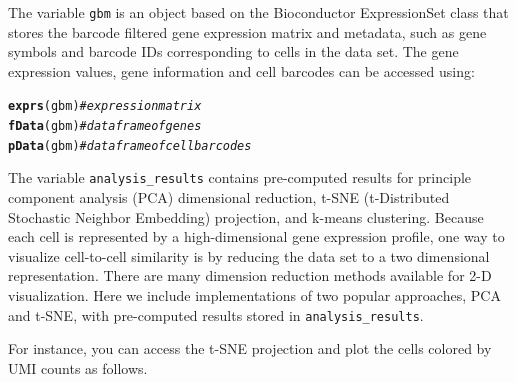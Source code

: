 \documentclass[10pt,oneside]{article}\usepackage[]{graphicx}\usepackage[]{color}
\makeatletter
\newcommand{\hlcom}[1]{\textcolor[rgb]{0.678,0.584,0.686}{\textit{#1}}}%
\newcommand{\hlstd}[1]{\textcolor[rgb]{0.345,0.345,0.345}{#1}}%
\newcommand{\hlkwd}[1]{\textcolor[rgb]{0.737,0.353,0.396}{\textbf{#1}}}%
\newenvironment{kframe}{%
 \def\at@end@of@kframe{}%
 \ifinner\ifhmode%
  \def\at@end@of@kframe{\end{minipage}}%
  \begin{minipage}{\columnwidth}%
 \fi\fi%
 \def\FrameCommand##1{\hskip\@totalleftmargin \hskip-\fboxsep
 \colorbox{shadecolor}{##1}\hskip-\fboxsep
     \hskip-\linewidth \hskip-\@totalleftmargin \hskip\columnwidth}%
 \MakeFramed {\advance\hsize-\width
   \@totalleftmargin\z@ \linewidth\hsize
   \@setminipage}}%
 {\par\unskip\endMakeFramed%
 \at@end@of@kframe}
\newenvironment{knitrout}{}{} %
\makeatother
\begin{document}
The variable \verb!gbm! is an object based on the Bioconductor ExpressionSet class that stores the barcode filtered gene expression matrix and metadata, such as gene symbols and barcode IDs corresponding to cells in the data set. The gene expression values, gene information and cell barcodes can be accessed using:
\begin{knitrout}
\color{fgcolor}\begin{kframe}
\begin{alltt}
\hlkwd{exprs}\hlstd{(gbm)} \hlcom{# expression matrix}
\hlkwd{fData}\hlstd{(gbm)} \hlcom{# data frame of genes}
\hlkwd{pData}\hlstd{(gbm)} \hlcom{# data frame of cell barcodes}
\end{alltt}
\end{kframe}
\end{knitrout}
The variable \verb!analysis_results! contains pre-computed results for principle component analysis (PCA) dimensional reduction, t-SNE (t-Distributed Stochastic Neighbor Embedding) projection, and k-means clustering. Because each cell is represented by a high-dimensional gene expression profile, one way to visualize cell-to-cell similarity is by reducing the data set to a two dimensional representation. There are many dimension reduction methods available for 2-D visualization. Here we include implementations of two popular approaches, PCA and t-SNE, with pre-computed results stored in \verb!analysis_results!.

For instance, you can access the t-SNE projection and plot the cells colored by UMI counts as follows.
\end{document}
